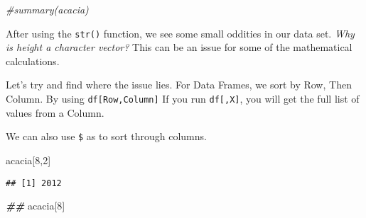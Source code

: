 \documentclass[
]{article}
\newenvironment{Shaded}{\begin{snugshade}}{\end{snugshade}}
\newcommand{\CommentTok}[1]{\textcolor[rgb]{0.56,0.35,0.01}{\textit{#1}}}
\newcommand{\DecValTok}[1]{\textcolor[rgb]{0.00,0.00,0.81}{#1}}
\newcommand{\DocumentationTok}[1]{\textcolor[rgb]{0.56,0.35,0.01}{\textbf{\textit{#1}}}}
\newcommand{\NormalTok}[1]{#1}
\begin{document}
\begin{Shaded}
\begin{Highlighting}[]
\CommentTok{\#summary(acacia)}
\end{Highlighting}
\end{Shaded}

After using the \texttt{str()} function, we see some small oddities in
our data set. \emph{Why is height a character vector?} This can be an
issue for some of the mathematical calculations.

Let's try and find where the issue lies. For Data Frames, we sort by
Row, Then Column. By using \texttt{df{[}Row,Column{]}} If you run
\texttt{df{[},X{]}}, you will get the full list of values from a Column.

We can also use \texttt{\$} as to sort through columns.

\begin{Shaded}
\begin{Highlighting}[]
\NormalTok{acacia[}\DecValTok{8}\NormalTok{,}\DecValTok{2}\NormalTok{] }
\end{Highlighting}
\end{Shaded}

\begin{verbatim}
## [1] 2012
\end{verbatim}

\begin{Shaded}
\begin{Highlighting}[]
\DocumentationTok{\#\#}
\NormalTok{acacia[}\DecValTok{8}\NormalTok{]}
\end{Highlighting}
\end{Shaded}
\end{document}
